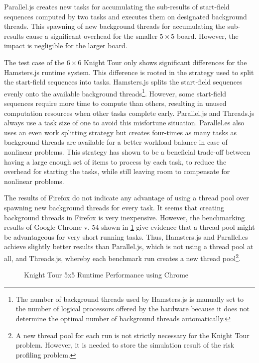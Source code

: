 Parallel.js creates new tasks for accumulating the sub-results of start-field sequences computed by two tasks and executes them on designated background threads. This spawning of new background threads for accumulating the sub-results cause a significant overhead for the smaller $5\times5$ board. However, the impact is negligible for the larger board.

The test case of the $6\times6$ Knight Tour only shows significant differences for the Hamsters.js runtime system. This difference is rooted in the strategy used to split the start-field sequences into tasks. Hamsters.js splits the start-field sequences evenly onto the available background threads\footnote{The number of background threads used by Hamsters.js is manually set to the number of logical processors offered by the hardware because it does not determine the optimal number of background threads automatically.}. However, some start-field sequences require more time to compute than others, resulting in unused computation resources when other tasks complete early. Parallel.js and Threads.js always use a task size of one to avoid this misfortune situation. Parallel.es also uses an even work splitting strategy but creates four-times as many tasks as background threads are available for a better workload balance in case of nonlinear problems. This strategy has shown to be a beneficial trade-off between having a large enough set of items to process by each task, to reduce the overhead for starting the tasks, while still leaving room to compensate for nonlinear problems. 


The results of Firefox do not indicate any advantage of using a thread pool over spawning new background threads for every task. It seems that creating background threads in Firefox is very inexpensive. However, the benchmarking results of Google Chrome v. 54 shown in \cref{fig:runtime-performance-chrome} give evidence that a thread pool might be advantageous for very short running tasks. Thus, Hamsters.js and Parallel.es achieve slightly better results than Parallel.js, which is not using a thread pool at all, and Threads.js, whereby each benchmark run creates a new thread pool\footnote{A new thread pool for each run is not strictly necessary for the Knight Tour problem. However, it is needed to store the simulation result of the risk profiling problem.}. 

\begin{figure}
	\centering
	
	\caption{Knight Tour 5x5 Runtime Performance using Chrome}
	\label{fig:runtime-performance-chrome}
\end{figure}

